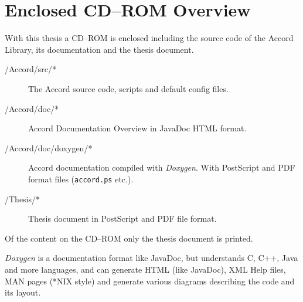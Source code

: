 
\pagebreak
\section{Enclosed CD--ROM Overview}

With this thesis a CD--ROM is enclosed including the source code of the Accord Library,
 its documentation and the thesis document.

\renewcommand{\descriptionlabel}[1]%
  {\hspace{\labelsep}{\tt{#1}}}
\begin{description}
\item[/Accord/src/*] The Accord source code, scripts and default config files.
\item[/Accord/doc/*] Accord Documentation Overview in Java\-Doc HTML format.
\item[/Accord/doc/doxygen/*] Accord documentation compiled with \emph{Doxygen}. With
  PostScript and PDF format files ({\small\tt accord.ps} etc.).
\item[/Thesis/*] Thesis document in PostScript and PDF file format.
\end{description}

Of the content on the CD--ROM only the thesis document is printed.

\emph{Doxygen} is a documentation format like JavaDoc, but understands
 C, C++, Java and more languages, and can generate HTML (like JavaDoc),
 XML Help files, MAN pages (*NIX style) and generate various diagrams
 describing the code and its layout.

